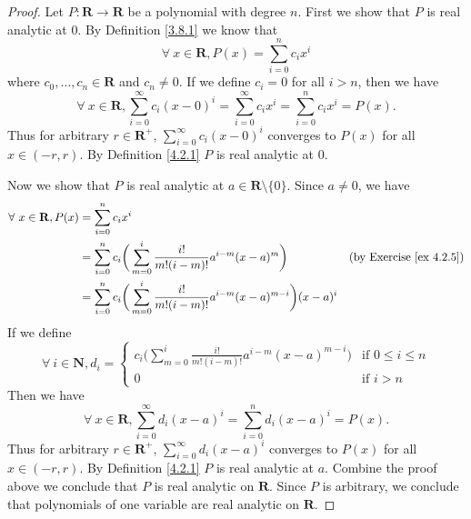 \begin{proof}
    Let \(P : \mathbf{R} \to \mathbf{R}\) be a polynomial with degree \(n\).
    First we show that \(P\) is real analytic at \(0\).
    By Definition \ref{3.8.1} we know that
    \[
        \forall\ x \in \mathbf{R}, P(x) = \sum_{i = 0}^n c_i x^i
    \]
    where \(c_0, \dots, c_n \in \mathbf{R}\) and \(c_n \neq 0\).
    If we define \(c_i = 0\) for all \(i > n\), then we have
    \[
        \forall\ x \in \mathbf{R}, \sum_{i = 0}^\infty c_i (x - 0)^i = \sum_{i = 0}^\infty c_i x^i = \sum_{i = 0}^n c_i x^i = P(x).
    \]
    Thus for arbitrary \(r \in \mathbf{R}^+\), \(\sum_{i = 0}^\infty c_i (x - 0)^i\) converges to \(P(x)\) for all \(x \in (-r, r)\).
    By Definition \ref{4.2.1} \(P\) is real analytic at \(0\).

    Now we show that \(P\) is real analytic at \(a \in \mathbf{R} \setminus \{0\}\).
    Since \(a \neq 0\), we have
    \begin{align*}
        \forall\ x \in \mathbf{R}, P(x) & = \sum_{i = 0}^n c_i x^i                                                                                                                         \\
                                        & = \sum_{i = 0}^n c_i \bigg(\sum_{m = 0}^i \frac{i!}{m! (i - m)!} a^{i - m} (x - a)^m\bigg)                 & \text{(by Exercise \ref{ex 4.2.5})} \\
                                        & = \sum_{i = 0}^n c_i \bigg(\sum_{m = 0}^i \frac{i!}{m! (i - m)!} a^{i - m} (x - a)^{m - i}\bigg) (x - a)^i
    \end{align*}
    If we define
    \[
        \forall\ i \in \mathbf{N}, d_i = \begin{cases}
            c_i \bigg(\sum_{m = 0}^i \frac{i!}{m! (i - m)!} a^{i - m} (x - a)^{m - i}\bigg) & \text{if } 0 \leq i \leq n \\
            0                                                                               & \text{if } i > n
        \end{cases}
    \]
    Then we have
    \[
        \forall\ x \in \mathbf{R}, \sum_{i = 0}^\infty d_i (x - a)^i = \sum_{i = 0}^n d_i (x - a)^i = P(x).
    \]
    Thus for arbitrary \(r \in \mathbf{R}^+\), \(\sum_{i = 0}^\infty d_i (x - a)^i\) converges to \(P(x)\) for all \(x \in (-r, r)\).
    By Definition \ref{4.2.1} \(P\) is real analytic at \(a\).
    Combine the proof above we conclude that \(P\) is real analytic on \(\mathbf{R}\).
    Since \(P\) is arbitrary, we conclude that polynomials of one variable are real analytic on \(\mathbf{R}\).
\end{proof}

